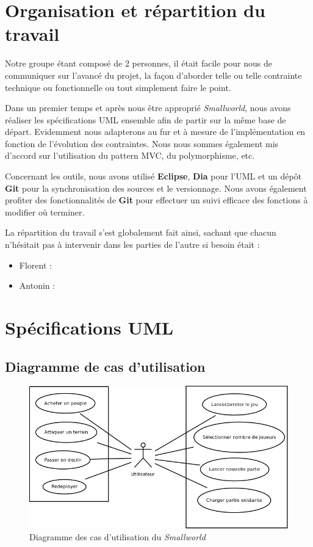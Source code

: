 \documentclass[a4paper]{report}
\begin{document}
\newpage
\chapter{Organisation et répartition du travail}
\par
Notre groupe étant composé de 2 personnes, il était facile pour nous de
communiquer sur l'avancé du projet, la façon d'aborder telle ou telle contrainte
technique ou fonctionnelle ou tout simplement faire le point.
\par
Dans un premier temps et après nous être approprié \textit{Smallworld}, nous
avons réaliser les spécifications UML ensemble afin de partir sur la même base
de départ. Evidemment nous adapterons au fur et à mesure de l'implémentation en
fonction de l'évolution des contraintes. Nous nous sommes également mis d'accord
sur l'utilisation du pattern MVC, du polymorphisme, etc.
\par
Concernant les outils, nous avons utilisé \textbf{Eclipse}, \textbf{Dia} pour
l'UML et un dépôt \textbf{Git} pour la synchronisation des sources et le
versionnage. Nous avons également profiter des fonctionnalités de \textbf{Git}
pour effectuer un suivi efficace des fonctions à modifier où terminer.
\par
La répartition du travail s'est globalement fait ainsi, sachant que chacun
n'hésitait pas à intervenir dans les parties de l'autre si besoin était :
\begin{itemize}
    \item Florent : %
    \item Antonin : %
\end{itemize}

\newpage
\chapter{Spécifications UML}
\section{Diagramme de cas d'utilisation}
\begin{figure}
    \begin{center}
        \includegraphics[width=\textwidth]{use_case.png}
        \caption{Diagramme des cas d'utilisation du \textit{Smallworld}}
    \end{center}
\end{figure}
\end{document}
